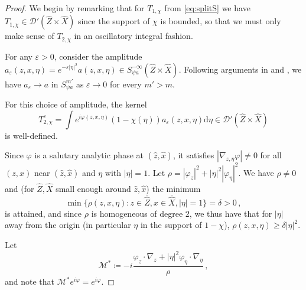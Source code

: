 \documentclass[
	fontsize=11pt, 
	twoside=false, 
	abstract=true, 
	a4paper,
]{scrartcl}
\newcommand{\eps}{\varepsilon}
\newcommand{\RR}{\mathbb{R}}
\newcommand{\dd}{\mathrm{d}}
\newcommand{\abs}[1]{\left\lvert#1\right\rvert}
\newcommand{\td}[1]{\tilde{#1}}
\begin{document}
\begin{proof}
	We begin by remarking that for $T_{1,\chi}$ from \cref{eq:splitS} we have $T_{1,\chi} \in \mathcal{D}'(\hat Z\times\hat X)$ since the support of $\chi$ is bounded, so that we must only make sense of $T_{2,\chi}$ in an oscillatory integral fashion.

	For any $\eps >0$, consider the amplitude $a_\eps(z,x,\eta) = e^{-\eps\abs{\eta}^2}a(z,x,\eta) \in S^{-\infty}_{\psi a}(\hat Z\times\hat X)$. Following arguments in \cite[\S~18.1.4]{MR4436039} and \cite[p.~88]{FIO1}, we have $a_\eps \to a$ in $S_{\psi a}^{m'}$ as $\eps \to 0$ for every $m'>m$.
	
	For this choice of amplitude, the kernel
	\[
		T_{2,\chi}^\eps = \int e^{i\varphi(z,x,\eta)}(1-\chi(\eta))a_\eps(z,x,\eta)\dd\eta \in \mathcal{D}'(\hat Z\times\hat X)
	\]
	is well-defined.

	
	Since $\varphi$ is a salutary analytic phase at $(\hat z,\hat x)$, it satisfies $\abs{\nabla_{z,\eta}\varphi}\neq 0$ for all $(z,x)$ near $(\hat z,\hat x)$ and $\eta$ with $\abs{\eta}=1$. Let $\rho = \abs{\varphi_z}^2+\abs{\eta}^2\abs{\varphi_\eta}^2$. We have $\rho \neq 0$ and (for $\hat Z, \hat X$ small enough around $\hat z, \hat x$) the minimum
	\[
		\min \{\rho(z,x,\eta) \colon z \in \overline{\hat Z}, x \in \overline{\hat X}, \abs{\eta} = 1\} = \delta > 0\,,
	\]
	is attained, and since $\rho$ is homogeneous of degree $2$, we thus have that for $\abs{\eta}$ away from the origin (in particular $\eta$ in the support of $1-\chi$), $\rho(z,x,\eta) \geq \delta \abs{\eta}^2$.

	Let 
	\[
		\mathcal{M}^\ast \coloneqq -i\frac{\varphi_z \cdot \nabla_z + \abs{\eta}^2\varphi_\eta \cdot \nabla_\eta}{\rho}\,,
	\]
	and note that $\mathcal{M}^\ast  e^{i\varphi} = e^{i\varphi}$.
	

\end{proof}
\end{document}
